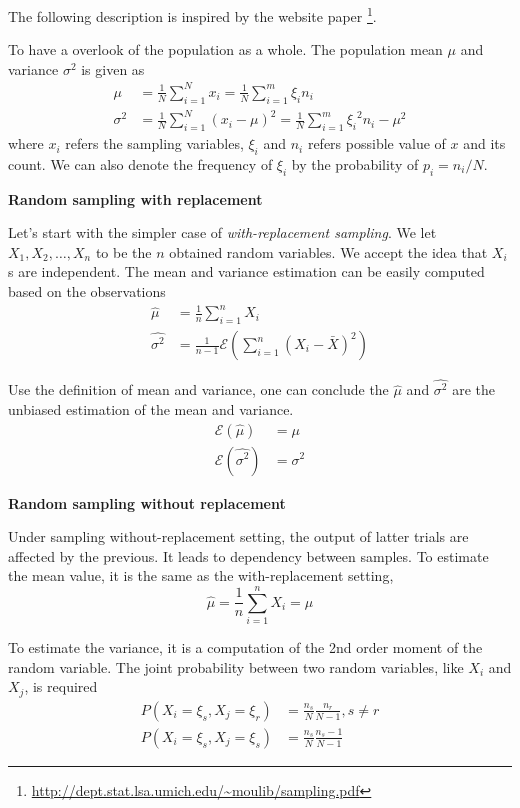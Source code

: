 The following description is inspired by the website paper \footnote{\url{http://dept.stat.lsa.umich.edu/~moulib/sampling.pdf}}.

To have a overlook of the population as a whole.
The population mean $\mu$ and variance $\sigma^2$ is given as
\begin{align*}
    \mu      & = \frac{1}{N} \sum_{i=1}^{N} x_i = \frac{1}{N} \sum_{i=1}^{m} \xi_i n_i                       \\
    \sigma^2 & = \frac{1}{N} \sum_{i=1}^{N} (x_i - \mu)^2 = \frac{1}{N} \sum_{i=1}^{m} {\xi_i}^2 n_i - \mu^2
\end{align*}
where $x_i$ refers the sampling variables, $\xi_i$ and $n_i$ refers possible value of $x$ and its count.
We can also denote the frequency of $\xi_i$ by the probability of $p_i = n_i / N$.

\textbf{Random sampling with replacement}

Let's start with the simpler case of \emph{with-replacement sampling}.
We let $X_1, X_2, \dots, X_n$ to be the $n$ obtained random variables.
We accept the idea that $X_i$s are independent.
The mean and variance estimation can be easily computed based on the observations
\begin{align*}
    \hat{\mu}      & = \frac{1}{n} \sum_{i=1}^{n} X_i                              \\
    \hat{\sigma^2} & = \frac{1}{n-1} \mathcal{E}(\sum_{i=1}^{n} (X_i - \bar{X})^2)
\end{align*}

Use the definition of mean and variance,
one can conclude the $\hat{\mu}$ and $\hat{\sigma^2}$ are the unbiased estimation of the mean and variance.
\begin{align*}
    \mathcal{E}(\hat{\mu})      & = \mu      \\
    \mathcal{E}(\hat{\sigma^2}) & = \sigma^2
\end{align*}

\textbf{Random sampling without replacement}

Under sampling without-replacement setting, the output of latter trials are affected by the previous.
It leads to dependency between samples.
To estimate the mean value, it is the same as the with-replacement setting,
\begin{equation*}
    \hat{\mu} = \frac{1}{n} \sum_{i=1}^{n} X_i = \mu
\end{equation*}

To estimate the variance, it is a computation of the 2nd order moment of the random variable.
The joint probability between two random variables, like $X_i$ and $X_j$, is required
\begin{align*}
    P(X_i=\xi_s, X_j=\xi_r) & = \frac{n_s}{N} \frac{n_r}{N-1}, s \neq r \\
    P(X_i=\xi_s, X_j=\xi_s) & = \frac{n_s}{N} \frac{n_s-1}{N-1}
\end{align*}

